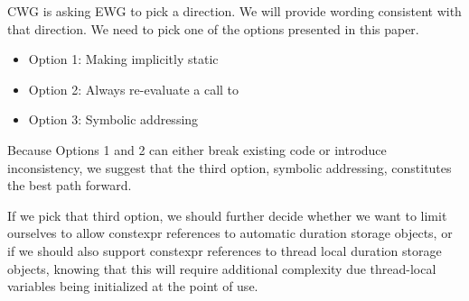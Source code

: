 \documentclass{wg21}
\begin{document}
CWG is asking EWG to pick a direction. We will provide wording consistent with that direction.
We need to pick one of the options presented in this paper.

\begin{itemize}
\item Option 1: Making  implicitly static
\item Option 2: Always re-evaluate a call to 
\item Option 3: Symbolic addressing
\end{itemize}

Because Options 1 and 2 can either break existing code or introduce inconsistency, we suggest that the third option, symbolic addressing, 
constitutes the best path forward.

If we pick that third option, we should further decide whether we want to limit ourselves to allow constexpr references to automatic duration storage objects, or if we should also support
constexpr references to thread local duration storage objects, knowing that this will require additional complexity due 
thread-local variables being initialized at the point of use.
\end{document}
